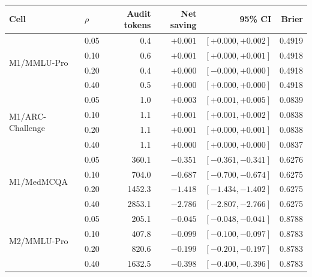 \begingroup
\centering
\small
\begin{tabular}{llrrrr}
\toprule
Cell & $\rho$ & Audit tokens & Net saving & 95\% CI & Brier \\
\midrule
\multirow{4}{*}{M1/MMLU-Pro}
 & 0.05 &    0.4 & $+0.001$ & $[+0.000,+0.002]$ & 0.4919 \\
 & 0.10 &    0.6 & $+0.001$ & $[+0.000,+0.001]$ & 0.4918 \\
 & 0.20 &    0.4 & $+0.000$ & $[-0.000,+0.000]$ & 0.4918 \\
 & 0.40 &    0.5 & $+0.000$ & $[+0.000,+0.000]$ & 0.4918 \\
\midrule
\multirow{4}{*}{M1/ARC-Challenge}
 & 0.05 &    1.0 & $+0.003$ & $[+0.001,+0.005]$ & 0.0839 \\
 & 0.10 &    1.1 & $+0.001$ & $[+0.001,+0.002]$ & 0.0838 \\
 & 0.20 &    1.1 & $+0.001$ & $[+0.000,+0.001]$ & 0.0838 \\
 & 0.40 &    1.1 & $+0.000$ & $[+0.000,+0.000]$ & 0.0837 \\
\midrule
\multirow{4}{*}{M1/MedMCQA}
 & 0.05 &  360.1 & $-0.351$ & $[-0.361,-0.341]$ & 0.6276 \\
 & 0.10 &  704.0 & $-0.687$ & $[-0.700,-0.674]$ & 0.6275 \\
 & 0.20 & 1452.3 & $-1.418$ & $[-1.434,-1.402]$ & 0.6275 \\
 & 0.40 & 2853.1 & $-2.786$ & $[-2.807,-2.766]$ & 0.6275 \\
\midrule
\multirow{4}{*}{M2/MMLU-Pro}
 & 0.05 &  205.1 & $-0.045$ & $[-0.048,-0.041]$ & 0.8788 \\
 & 0.10 &  407.8 & $-0.099$ & $[-0.100,-0.097]$ & 0.8783 \\
 & 0.20 &  820.6 & $-0.199$ & $[-0.201,-0.197]$ & 0.8783 \\
 & 0.40 & 1632.5 & $-0.398$ & $[-0.400,-0.396]$ & 0.8783 \\
\bottomrule
\end{tabular}
\par\medskip
{}
\label{tab:a07_rho_sensitivity}
\par
\endgroup
\vspace{\baselineskip}
